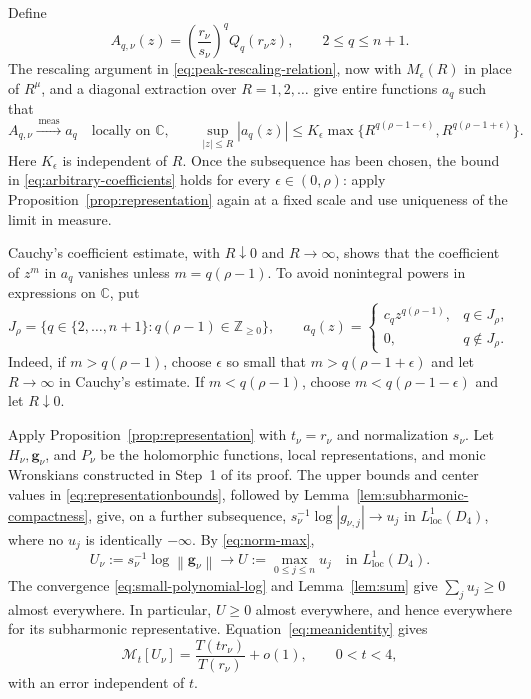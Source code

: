 \documentclass[11pt,letterpaper,reqno]{amsart}
\theoremstyle{remark}
\numberwithin{equation}{section}
\newcommand{\C}{\mathbb C}
\newcommand{\Z}{\mathbb Z}
\newcommand{\loc}{\mathrm{loc}}
\newcommand{\mean}[2]{\mathcal M_{#1}\!\left[#2\right]}
\newcommand{\norm}[1]{\left\lVert#1\right\rVert}
\newcommand{\convmeas}{\xrightarrow{\,\mathrm{meas}\,}}
\newcommand{\gv}{\bm g}
\begin{document}
Define
\begin{equation}\label{eq:arbitrary-scaled-coefficients}
 A_{q,\nu}(z)=\left(\frac{r_\nu}{s_\nu}\right)^qQ_q(r_\nu z),
 \qquad 2\leq q\leq n+1.
\end{equation}
The rescaling argument in \eqref{eq:peak-rescaling-relation}, now with
$M_\epsilon(R)$ in place of $R^\mu$, and a diagonal extraction over
$R=1,2,\ldots$ give entire functions $a_q$ such that
\begin{equation}\label{eq:arbitrary-coefficients}
 A_{q,\nu}\convmeas a_q\quad\text{locally on }\C,
 \qquad
 \sup_{|z|\leq R}|a_q(z)|
 \leq K_\epsilon\max\{R^{q(\rho-1-\epsilon)},
                         R^{q(\rho-1+\epsilon)}\}.
\end{equation}
Here $K_\epsilon$ is independent of $R$. Once the subsequence has been
chosen, the bound in \eqref{eq:arbitrary-coefficients} holds for every
$\epsilon\in(0,\rho)$: apply Proposition~\ref{prop:representation} again at
a fixed scale and use uniqueness of the limit in measure.

Cauchy's coefficient estimate, with $R\downarrow0$ and $R\to\infty$,
shows that the coefficient of $z^m$ in $a_q$ vanishes unless
$m=q(\rho-1)$. To avoid nonintegral powers in expressions on $\C$, put
\begin{equation}\label{eq:monomial-coefficients}
 J_\rho=\{q\in\{2,\ldots,n+1\}:q(\rho-1)\in\Z_{\geq0}\},
 \qquad
 a_q(z)=
 \begin{cases}
 c_qz^{q(\rho-1)},&q\in J_\rho,\\
 0,&q\notin J_\rho.
 \end{cases}
\end{equation}
Indeed, if $m>q(\rho-1)$, choose $\epsilon$ so small that
$m>q(\rho-1+\epsilon)$ and let $R\to\infty$ in Cauchy's estimate.
If $m<q(\rho-1)$, choose $m<q(\rho-1-\epsilon)$ and let $R\downarrow0$.

Apply Proposition~\ref{prop:representation} with $t_\nu=r_\nu$ and
normalization $s_\nu$. Let $H_\nu,\gv_\nu$, and $P_\nu$ be the
holomorphic functions, local representations, and monic Wronskians
constructed in Step~1 of its proof. The upper bounds and center
values in \eqref{eq:representationbounds}, followed by
Lemma~\ref{lem:subharmonic-compactness}, give, on a further subsequence,
$s_\nu^{-1}\log|g_{\nu,j}|\to u_j$ in $L^1_{\loc}(D_4)$, where no
$u_j$ is identically $-\infty$. By \eqref{eq:norm-max},
\begin{equation}\label{eq:norm-limit}
 U_\nu:=s_\nu^{-1}\log\norm{\gv_\nu}
 \longrightarrow U:=\max_{0\leq j\leq n}u_j
 \quad\text{in }L^1_{\loc}(D_4).
\end{equation}
The convergence \eqref{eq:small-polynomial-log} and Lemma~\ref{lem:sum}
give $\sum_j u_j\geq0$ almost everywhere. In particular, $U\geq0$
almost everywhere, and hence everywhere for its subharmonic
representative. Equation~\eqref{eq:meanidentity} gives
\begin{equation}\label{eq:radial-mean}
 \mean t{U_\nu}=\frac{T(tr_\nu)}{T(r_\nu)}+o(1),
 \qquad 0<t<4,
\end{equation}
with an error independent of $t$.
\end{document}
